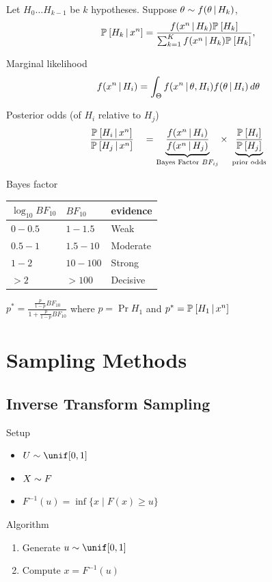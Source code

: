 \documentclass[landscape]{article}
\begin{document}
\begin{multicols*}{2}
Let $H_0{\ldots}H_{k-1}$ be $k$ hypotheses.
Suppose $\theta \sim f(\theta\,|\, H_k)$,
\[\mathbb{P}_{}\left[H_k\,|\, x^n\right]
= \frac{f(x^n\,|\, H_k)\mathbb{P}_{}\left[H_k\right]}{\sum_{k=1}^K f(x^n\,|\, H_k)\mathbb{P}_{}\left[H_k\right]},\]

Marginal likelihood
\[f(x^n\,|\, H_i)
= \int_\Theta f(x^n\,|\, \theta,H_i)f(\theta\,|\, H_i) \,d\theta\]

Posterior odds (of $H_i$ relative to $H_j$)
\[\frac{\Pr{H_i\giv x^n}}{\Pr{H_j\giv x^n}} \quad
= \underbrace{\frac{f(x^n\giv H_i)}{f(x^n\giv H_j)}}%
  _{\text{Bayes Factor }BF_{ij}}
\times \;\underbrace{\frac{\Pr{H_i}}{\Pr{H_j}}}_{\text{prior odds}}\]

\columnbreak
Bayes factor

\centering
\begin{tabular}{lll}
  $\log_{10} BF_{10}$ & $BF_{10}$ & \textsf{evidence} \\
  \toprule
  $0 - 0.5$ & $1 - 1.5$   & Weak \\
  $0.5 - 1$ & $1.5 - 10$  & Moderate \\
  $1 - 2$   & $10 - 100$  & Strong \\
  $> 2$     & $> 100$     & Decisive \\
\end{tabular}

\vspace*{2ex}

$p^* = \displaystyle\frac{\frac{p}{1-p}BF_{10}}{1+\frac{p}{1-p}BF_{10}}$
where $p=\Pr{H_1}$ and $p^* = \mathbb{P}_{}\left[H_1 \,|\, x^n\right]$

\raggedright

\section{Sampling Methods}

\subsection{Inverse Transform Sampling}

Setup
\begin{itemize}
  \item $U \dist \unif[0,1]$
  \item $X \sim F$
  \item $F^{-1}(u)= \inf\{ x \mid F(x) \ge u\}$
\end{itemize}

Algorithm
\begin{enumerate}
  \item Generate $u \dist \unif[0,1]$
  \item Compute $x = F^{-1}(u)$
\end{enumerate}


\end{multicols*}
\end{document}
